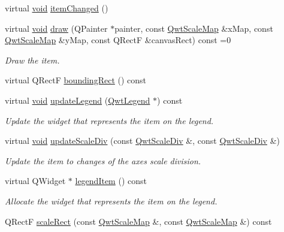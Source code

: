 \begin{DoxyCompactItemize}
virtual \hyperlink{group___u_a_v_objects_plugin_ga444cf2ff3f0ecbe028adce838d373f5c}{void} \hyperlink{class_qwt_plot_item_ad956fdbce5b0721abccce6d09fe4d5ce}{item\-Changed} ()
\item 
virtual \hyperlink{group___u_a_v_objects_plugin_ga444cf2ff3f0ecbe028adce838d373f5c}{void} \hyperlink{class_qwt_plot_item_a0b0d6589d5db81ce72e6b33c4fbb21f9}{draw} (Q\-Painter $\ast$painter, const \hyperlink{class_qwt_scale_map}{Qwt\-Scale\-Map} \&x\-Map, const \hyperlink{class_qwt_scale_map}{Qwt\-Scale\-Map} \&y\-Map, const Q\-Rect\-F \&canvas\-Rect) const =0
\begin{DoxyCompactList}\small\item\em Draw the item. \end{DoxyCompactList}\item 
virtual Q\-Rect\-F \hyperlink{class_qwt_plot_item_aec3c408e14af30b82b52c1197310eb21}{bounding\-Rect} () const 
\item 
virtual \hyperlink{group___u_a_v_objects_plugin_ga444cf2ff3f0ecbe028adce838d373f5c}{void} \hyperlink{class_qwt_plot_item_a193770cd20609a368c5130de59cb782e}{update\-Legend} (\hyperlink{class_qwt_legend}{Qwt\-Legend} $\ast$) const 
\begin{DoxyCompactList}\small\item\em Update the widget that represents the item on the legend. \end{DoxyCompactList}\item 
virtual \hyperlink{group___u_a_v_objects_plugin_ga444cf2ff3f0ecbe028adce838d373f5c}{void} \hyperlink{class_qwt_plot_item_abf6a70847d3db952161ca4d4a952eea0}{update\-Scale\-Div} (const \hyperlink{class_qwt_scale_div}{Qwt\-Scale\-Div} \&, const \hyperlink{class_qwt_scale_div}{Qwt\-Scale\-Div} \&)
\begin{DoxyCompactList}\small\item\em Update the item to changes of the axes scale division. \end{DoxyCompactList}\item 
virtual Q\-Widget $\ast$ \hyperlink{class_qwt_plot_item_a09824eda5e564a853e6586bc387a3b4b}{legend\-Item} () const 
\begin{DoxyCompactList}\small\item\em Allocate the widget that represents the item on the legend. \end{DoxyCompactList}\item 
Q\-Rect\-F \hyperlink{class_qwt_plot_item_a186036cbee194b87b9bc4afb693c27f4}{scale\-Rect} (const \hyperlink{class_qwt_scale_map}{Qwt\-Scale\-Map} \&, const \hyperlink{class_qwt_scale_map}{Qwt\-Scale\-Map} \&) const 

\end{DoxyCompactItemize}
